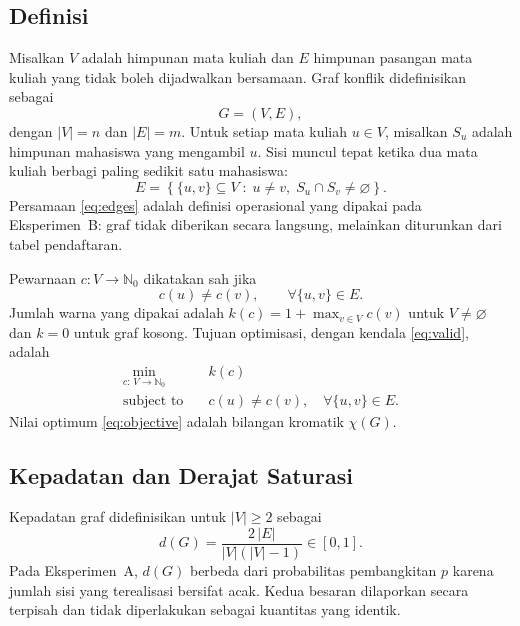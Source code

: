 \documentclass[conference,a4paper]{IEEEtran}
\begin{document}
\subsection{Definisi}
Misalkan $V$ adalah himpunan mata kuliah dan $E$ himpunan pasangan mata kuliah
yang tidak boleh dijadwalkan bersamaan. Graf konflik didefinisikan sebagai
\begin{equation}
G=(V,E),
\label{eq:graph}
\end{equation}
dengan $|V|=n$ dan $|E|=m$. Untuk setiap mata kuliah $u \in V$, misalkan $S_u$
adalah himpunan mahasiswa yang mengambil $u$. Sisi muncul tepat ketika dua mata
kuliah berbagi paling sedikit satu mahasiswa:
\begin{equation}
E=\left\{\{u,v\}\subseteq V \;:\; u\neq v,\; S_u\cap S_v\neq\varnothing\right\}.
\label{eq:edges}
\end{equation}
Persamaan \eqref{eq:edges} adalah definisi operasional yang dipakai pada
Eksperimen~B: graf tidak diberikan secara langsung, melainkan diturunkan dari
tabel pendaftaran.

Pewarnaan $c: V \to \mathbb{N}_0$ dikatakan sah jika
\begin{equation}
c(u)\neq c(v), \qquad \forall \{u,v\}\in E .
\label{eq:valid}
\end{equation}
Jumlah warna yang dipakai adalah $k(c)=1+\max_{v\in V} c(v)$ untuk $V\neq
\varnothing$ dan $k=0$ untuk graf kosong. Tujuan optimisasi, dengan kendala
\eqref{eq:valid}, adalah
\begin{equation}
\begin{aligned}
\min_{c:\,V\to\mathbb{N}_0}\quad & k(c) \\
\text{subject to}\quad & c(u)\neq c(v),\quad \forall \{u,v\}\in E .
\end{aligned}
\label{eq:objective}
\end{equation}
Nilai optimum \eqref{eq:objective} adalah bilangan kromatik $\chi(G)$.

\subsection{Kepadatan dan Derajat Saturasi}
Kepadatan graf didefinisikan untuk $|V|\ge 2$ sebagai
\begin{equation}
d(G)=\frac{2\,|E|}{|V|\left(|V|-1\right)} \in [0,1].
\label{eq:density}
\end{equation}
Pada Eksperimen~A, $d(G)$ berbeda dari probabilitas pembangkitan $p$ karena
jumlah sisi yang terealisasi bersifat acak. Kedua besaran dilaporkan secara
terpisah dan tidak diperlakukan sebagai kuantitas yang identik.
\end{document}
